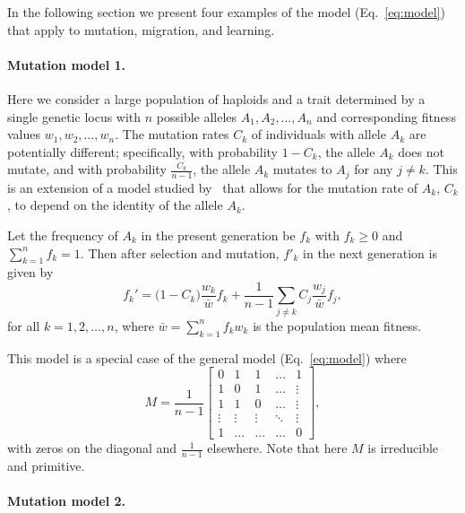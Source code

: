 \documentclass[9pt, a4paper, twocolumn]{extarticle}
\begin{document}
In the following section we present four examples of the model (Eq.~\ref{eq:model}) that apply to mutation, migration, and learning.

\paragraph*{Mutation model 1.}\label{sec:mut_model_1}

Here we consider a large population of haploids and a trait determined by a single genetic locus with $n$ possible alleles $A_1, A_2, \ldots, A_n$ and corresponding fitness values $w_1, w_2, \ldots, w_n$.
The mutation rates $C_k$ of individuals with allele $A_k$ are potentially different;
specifically, with probability $1-C_k$, the allele $A_k$ does not mutate, and with probability $\frac{C_k}{n-1}$, the allele $A_k$ mutates to $A_j$ for any $j \ne k$.
This is an extension of a model studied by~\citet{Altenberg2017} that allows for the mutation rate of $A_k$, $C_k$, to depend on the identity of the allele $A_k$.

Let the frequency of $A_k$ in the present generation be $f_k$ with $f_k \ge 0$ and $\sum_{k=1}^{n}{f_k}=1$.
Then after selection and mutation, $f'_k$ in the next generation is given by
\begin{equation}
f_k' = \big(1 - C_k\big) \frac{w_k}{\bar{w}} f_k + \frac{1}{n-1} \sum_{j \ne k}{C_j \frac{w_j}{\bar{w}} f_j},
\label{eq:mutation_model_1}
\end{equation}
for all $k=1, 2, \ldots, n$, where $\bar{w} = \sum_{k=1}^{n}{f_k w_k}$ is the population mean fitness.

This model is a special case of the general model (Eq.~\ref{eq:model}) where
\begin{equation} 
{M} = \frac{1}{n-1} \begin{bmatrix}
0 & 1 & 1 & \ldots & 1 \\
1 & 0 & 1 & \ldots & \vdots \\
1 & 1 & 0 & \ldots & \vdots \\
\vdots & \vdots & \vdots & \ddots & \vdots \\
1 & \ldots & \ldots & \ldots & 0
\end{bmatrix},
\end{equation}
with zeros on the diagonal and $\frac{1}{n-1}$ elsewhere.
Note that here ${M}$ is irreducible and primitive.

\paragraph*{Mutation model 2.}\label{sec:mut_model_2}
\end{document}
